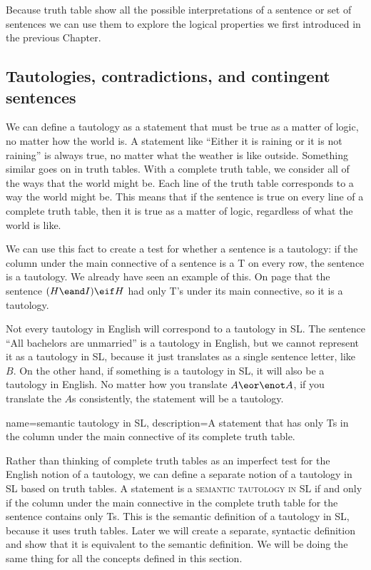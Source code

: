 Because truth table show all the possible interpretations of a sentence or set of sentences we can use them to explore the logical properties we first introduced in the previous Chapter.

\subsection{Tautologies, contradictions, and contingent sentences}
We can define a tautology as a statement that must be true as a matter of logic, no matter how the world is. A statement like ``Either it is raining or it is not raining'' is always true, no matter what the weather is like outside. Something similar goes on in truth tables. With a complete truth table, we consider all of the ways that the world might be. Each line of the truth table corresponds to a way the world might be. This means that if the sentence is true on every line of a complete truth table, then it is true as a matter of logic, regardless of what the world is like.

We can use this fact to create a test for whether a sentence is a tautology: if the column under the main connective of a sentence is a T on every row, the sentence is a tautology. We already have seen an example of this. On page \pageref{tautology3.1} that the sentence $(H \eand I)\eif H$ had only T's under its main connective, so it is a tautology.

Not every tautology in English will correspond to a tautology in SL. The sentence ``All bachelors are unmarried'' is a tautology in English, but we cannot represent it as a tautology in SL, because it just translates as a single sentence letter, like $B$. On the other hand, if something is a tautology in SL, it will also be a tautology in English. No matter how you translate $A \eor \enot A$, if you translate the $A$s consistently, the statement will be a tautology. 

{
name=semantic tautology in SL,
description={A statement that has only Ts in the column under the main connective of its complete truth table.}
}

\label{semantic_definitions_in_SL}
Rather than thinking of complete truth tables as an imperfect test for the English notion of a tautology, we can define a separate notion of a tautology in SL based on truth tables. A statement is a \textsc{\gls{semantic tautology in SL}} \label{def:semantic_tautology_in_sl} if and only if the column  under the main connective in the complete truth table for the sentence contains only Ts. This is the semantic definition of a tautology in SL, because it uses truth tables. Later we will create a separate, syntactic definition and show that it is equivalent to the semantic definition. We will be doing the same thing for all the concepts defined in this section. 

